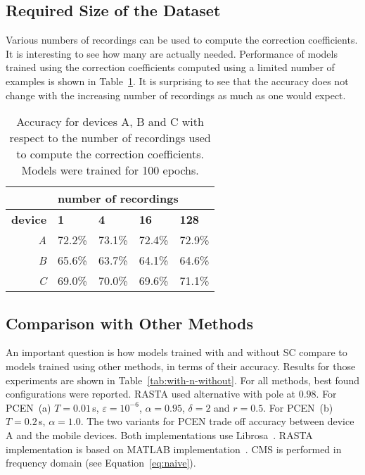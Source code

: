 \documentclass[a4paper]{article}
\begin{document}
\subsection{Required Size of the Dataset}
\label{ssec:num-examples}

Various numbers of recordings can be used to compute the correction coefficients. It is interesting to see how many are actually needed. Performance of models trained using the correction coefficients computed using a limited number of examples is shown in Table~\ref{tab:accuracy-num-examples}. It is surprising to see that the accuracy does not change with the increasing number of recordings as much as one would expect.

\begin{table}[htb]
\centering
\caption{Accuracy for devices A, B and C with respect to the number of recordings used to compute the correction coefficients. Models were trained for 100 epochs.}
\begin{tabular}{@{}r|llll@{}}
\toprule
                & \multicolumn{4}{l}{\textbf{number of recordings}}         \\ \midrule
\textbf{device} & \textbf{1} & \textbf{4} & \textbf{16} & \textbf{128} \\ \midrule
\textit{A}      & 72.2\%     & 73.1\%     & 72.4\%      & 72.9\%       \\
\textit{B}      & 65.6\%     & 63.7\%     & 64.1\%      & 64.6\%       \\
\textit{C}      & 69.0\%     & 70.0\%     & 69.6\%      & 71.1\%       \\ \bottomrule
\end{tabular}
\label{tab:accuracy-num-examples}
\end{table}

\subsection{Comparison with Other Methods}
\label{ssec:with-n-without}

An important question is how models trained with and without SC compare to models trained using other methods, in terms of their accuracy. Results for those experiments are shown in Table~\ref{tab:with-n-without}.
For all methods, best found configurations were reported. 
RASTA used alternative with pole at $0.98$.
For PCEN~(a) $T=0.01$\,s, $\varepsilon=10^{-6}$, $\alpha=0.95$, $\delta=2$ and $r = 0.5$.
For PCEN~(b) $T=0.2$\,s, $\alpha=1.0$. The two variants for PCEN trade off accuracy between device A and the mobile devices.
Both implementations use Librosa~\cite{mcfeeLibrosaAudioMusic2015}. RASTA implementation is based on MATLAB implementation~\cite{ellisPLPRASTAMFCC2005}. CMS is performed in frequency domain (see Equation~\eqref{eq:naive}). 
\end{document}
